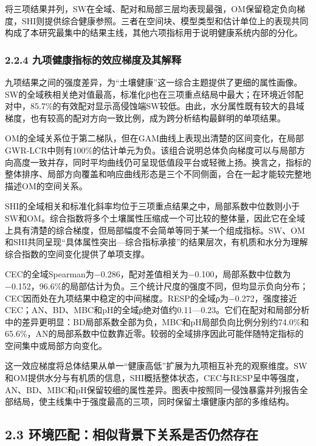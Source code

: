 \documentclass[
  11pt,
  a4paper,
]{ctexart}
\begin{document}
将三项结果并列，SW在全域、配对和局部三层均表现最强，OM保留稳定负向梯度，SHI则提供综合健康参照。三者在空间块、模型类型和估计单位上的表现共同构成了本研究最集中的结果主线，其他六项指标用于说明健康系统内部的分化。

\hypertarget{ux4e5dux9879ux5065ux5eb7ux6307ux6807ux7684ux6548ux5e94ux68afux5ea6ux53caux5176ux89e3ux91ca}{%
\subsubsection{2.2.4
九项健康指标的效应梯度及其解释}\label{ux4e5dux9879ux5065ux5eb7ux6307ux6807ux7684ux6548ux5e94ux68afux5ea6ux53caux5176ux89e3ux91ca}}

九项结果之间的强度差异，为``土壤健康''这一综合主题提供了更细的属性画像。SW的全域秩相关绝对值最高，标准化β也在三项重点结局中最大；在环境近邻配对中，85.7\%的有效配对显示高侵蚀端SW较低。由此，水分属性既有较大的县域梯度，也有较高的配对方向一致比例，成为跨分析结构最鲜明的单项结果。

OM的全域关系位于第二梯队，但在GAM曲线上表现出清楚的区间变化，在局部GWR-LCR中则有100\%的估计单元为负。该组合说明总体负向梯度可以与局部方向高度一致并存，同时平均曲线仍可呈现低值段平台或轻微上扬。换言之，指标的整体排序、局部方向覆盖和响应曲线形态是三个不同侧面，合在一起才能较完整地描述OM的空间关系。

SHI的全域相关和标准化斜率均位于三项重点结果之中，局部系数中位数则小于SW和OM。综合指数将多个土壤属性压缩成一个可比较的整体量，因此它在全域上具有清楚的综合梯度，但局部幅度不会简单等同于某一个组成指标。SW、OM和SHI共同呈现``具体属性突出---综合指标承接''的结果层次，有机质和水分为理解综合指数的空间变化提供了单项支撑。

CEC的全域Spearman为−0.286，配对差值相关为−0.100，局部系数中位数为−0.152，96.6\%的局部估计为负。三个统计尺度的强度不同，但均显示负向分布；CEC因而处在九项结果中稳定的中间梯度。RESP的全域ρ为−0.272，强度接近CEC；AN、BD、MBC和pH的全域ρ绝对值约0.11---0.23。它们在配对和局部分析中的差异更明显：BD局部系数全部为负，MBC和pH局部负向比例分别约74.0\%和65.6\%，AN的局部系数中位数靠近零。较弱的全域排序因此可能伴随特定指标的空间集中或局部方向变化。

这一效应梯度将总体结果从单一``健康高低''扩展为九项相互补充的观察维度。SW和OM提供水分与有机质的信息，SHI概括整体状态，CEC与RESP呈中等强度，AN、BD、MBC和pH保留较细的属性差异。图表中按照同一侵蚀暴露并列报告全部结局，使主线集中于强度最高的三项，同时保留土壤健康内部的多维结构。

\hypertarget{ux73afux5883ux5339ux914dux76f8ux4f3cux80ccux666fux4e0bux5173ux7cfbux662fux5426ux4ecdux7136ux5b58ux5728}{%
\subsection{2.3
环境匹配：相似背景下关系是否仍然存在}\label{ux73afux5883ux5339ux914dux76f8ux4f3cux80ccux666fux4e0bux5173ux7cfbux662fux5426ux4ecdux7136ux5b58ux5728}}
\end{document}
